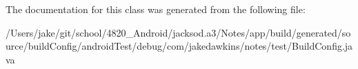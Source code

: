 The documentation for this class was generated from the following file\+:\begin{DoxyCompactItemize}
\item 
/\+Users/jake/git/school/4820\+\_\+\+Android/jacksod.\+a3/\+Notes/app/build/generated/source/build\+Config/android\+Test/debug/com/jakedawkins/notes/test/Build\+Config.\+java\end{DoxyCompactItemize}
